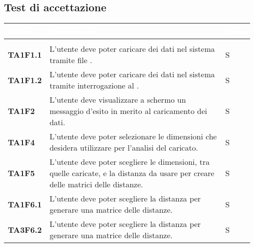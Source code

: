 \subsection{Test di accettazione}


{
\renewcommand{\arraystretch}{1.5}
\renewcommand\extrarowheight{1.5pt}
\setlength\arrayrulewidth{1pt}
\begin{longtable}{ C{2cm} | C{12cm}| C{1.5cm} } 
		\textcolor{white}{\textbf{Codice}} & 
		\textcolor{white}{\textbf{Descrizione}} & 
		\textcolor{white}{\textbf{Stato}} \\
		\endfirsthead
		\\
	    \endfoot
	    \endlastfoot

\textbf{TA1F1.1} & 
L'utente deve poter caricare dei dati nel sistema tramite file . & 
S\\

\textbf{TA1F1.2} & 
L'utente deve poter caricare dei dati nel sistema tramite interrogazione al . & 
S\\

\textbf{TA1F2} & 
L'utente deve visualizzare a schermo un messaggio d'esito in merito al caricamento dei dati. & 
S\\
		
\textbf{TA1F4} & 
L'utente deve poter selezionare le dimensioni che desidera utilizzare per l'analisi del  caricato. & 
S\\	

\textbf{TA1F5} & 
L'utente deve poter scegliere le dimensioni, tra quelle caricate, e la distanza da usare per creare delle matrici delle distanze. & 
S\\	

\textbf{TA1F6.1} & 
L'utente deve poter scegliere la distanza \textit{} per generare una matrice delle distanze. & 
S\\

\textbf{TA3F6.2} & 
L'utente deve poter scegliere la distanza \textit{} per generare una matrice delle distanze. & 
S\\


\end{longtable}}
